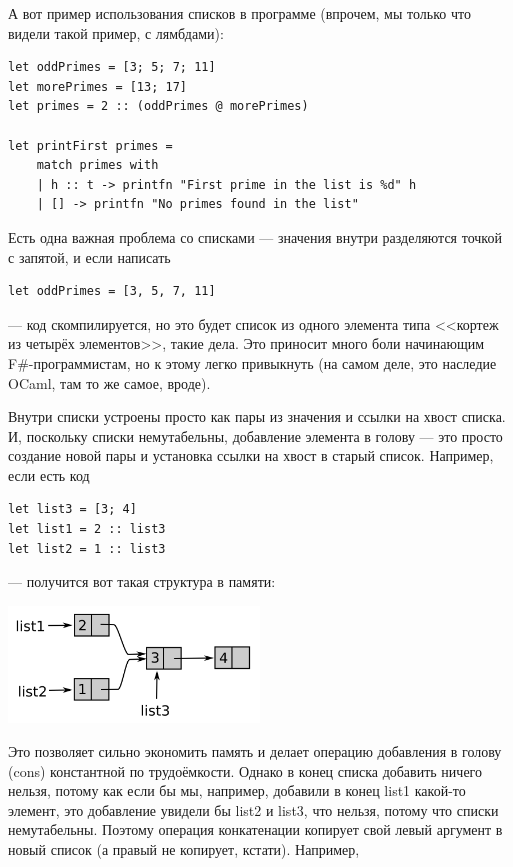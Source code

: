 \documentclass{../../text-style}
\begin{document}
А вот пример использования списков в программе (впрочем, мы только что видели такой пример, с лямбдами):

\begin{verbatim}
let oddPrimes = [3; 5; 7; 11]
let morePrimes = [13; 17]
let primes = 2 :: (oddPrimes @ morePrimes)

let printFirst primes =
    match primes with
    | h :: t -> printfn "First prime in the list is %d" h
    | [] -> printfn "No primes found in the list"
\end{verbatim}

Есть одна важная проблема со списками --- значения внутри разделяются точкой с запятой, и если написать

\begin{verbatim}
let oddPrimes = [3, 5, 7, 11]
\end{verbatim}

--- код скомпилируется, но это будет список из одного элемента типа <<кортеж из четырёх элементов>>, такие дела. Это приносит много боли начинающим F\#-программистам, но к этому легко привыкнуть (на самом деле, это наследие OCaml, там то же самое, вроде).

Внутри списки устроены просто как пары из значения и ссылки на хвост списка. И, поскольку списки немутабельны, добавление элемента в голову --- это просто создание новой пары и установка ссылки на хвост в старый список. Например, если есть код

\begin{verbatim}
let list3 = [3; 4]
let list1 = 2 :: list3
let list2 = 1 :: list3
\end{verbatim}

--- получится вот такая структура в памяти:

\begin{center}
    \includegraphics[width=0.5\textwidth]{lists.png}
\end{center}

Это позволяет сильно экономить память и делает операцию добавления в голову (cons) константной по трудоёмкости. Однако в конец списка добавить ничего нельзя, потому как если бы мы, например, добавили в конец list1 какой-то элемент, это добавление увидели бы list2 и list3, что нельзя, потому что списки немутабельны. Поэтому операция конкатенации копирует свой левый аргумент в новый список (а правый не копирует, кстати). Например, 
\end{document}
